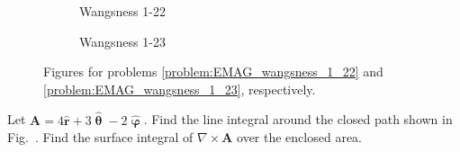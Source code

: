             \begin{figure}[H]
                \centering
                \captionsetup{type=figure}
                \begin{subfigure}[b]{0.49\textwidth}
                    \centering
                    \captionsetup{type=figure}
                    
                    \caption{Wangsness 1-22}
                    \label{fig:EMAG_1_wangsness_1_22}
                \end{subfigure}
                \begin{subfigure}[b]{0.49\textwidth}
                    \centering
                    \captionsetup{type=figure}
                    
                    \caption{Wangsness 1-23}
                    \label{fig:EMAG_1_wangsness_1_23}
                \end{subfigure}
                \caption[Figures for Wangsness 1-22 and 1-23]{%
                    Figures for problems \ref{problem:EMAG_wangsness_1_22}
                    and \ref{problem:EMAG_wangsness_1_23}, respectively.
                }
            \end{figure}
            \begin{problem}[Wangsness 1-23]
                \label{problem:EMAG_wangsness_1_23}
                Let $\mathbf{A}=4\hat{\mathbf{r}}+3\hat{\boldsymbol{\uptheta}}
                -2\hat{\boldsymbol{\upvarphi}}$. Find the line integral
                around the closed path shown in
                Fig.~.
                Find the surface integral of
                $\nabla \times \mathbf{A}$ over the enclosed area.
            \end{problem}
